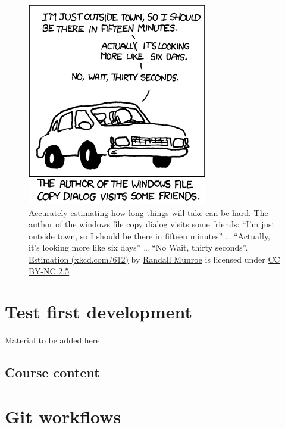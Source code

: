 \documentclass[
]{book}
\begin{document}
\begin{figure}

{\centering \includegraphics[width=0.75\linewidth]{images/xkcd-estimation} 

}

\caption{Accurately estimating how long things will take can be hard. The author of the windows file copy dialog visits some friends: ``I'm just outside town, so I should be there in fifteen minutes'' \ldots{} ``Actually, it's looking more like six days'' \ldots{} ``No Wait, thirty seconds''. \href{https://xkcd.com/612/}{Estimation (xkcd.com/612)} by \href{https://en.wikipedia.org/wiki/Randall_Munroe}{Randall Munroe} is licensed under \href{https://creativecommons.org/licenses/by-nc/2.5/}{CC BY-NC 2.5}}\label{fig:xkcd-estimation-fig}
\end{figure}



\hypertarget{testing}{%
\chapter{Test first development}\label{testing}}

Material to be added here

\hypertarget{course-content-1}{%
\section{Course content}\label{course-content-1}}

\hypertarget{flowing}{%
\chapter{Git workflows}\label{flowing}}
\end{document}
